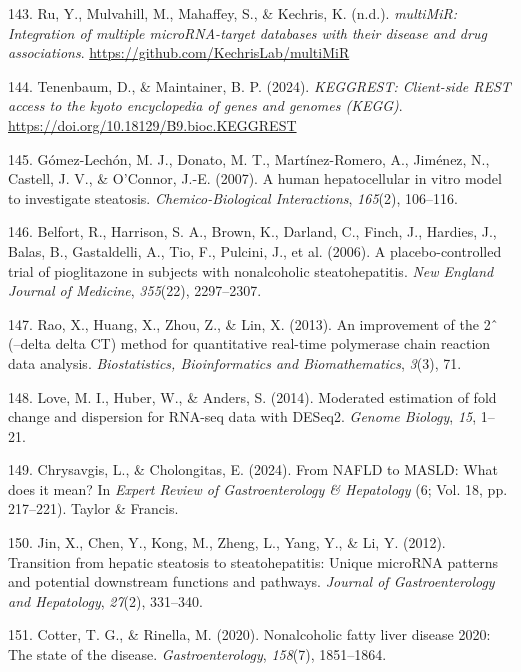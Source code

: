 \documentclass[
  11pt,
  letterpaper,
]{book}
\newlength{\cslhangindent}
\newenvironment{CSLReferences}[2] %
 {\begin{list}{}{%
  \setlength{\itemindent}{0pt}
  \setlength{\leftmargin}{0pt}
  \setlength{\parsep}{0pt}
  \ifodd #1
   \setlength{\leftmargin}{\cslhangindent}
   \setlength{\itemindent}{-1\cslhangindent}
  \fi
  \setlength{\itemsep}{#2\baselineskip}}}
 {\end{list}}
\begin{document}
\begin{CSLReferences}{1}{0}
143. Ru, Y., Mulvahill, M., Mahaffey, S., \& Kechris, K. (n.d.).
\emph{multiMiR: Integration of multiple microRNA-target databases with
their disease and drug associations}.
\url{https://github.com/KechrisLab/multiMiR}

144. Tenenbaum, D., \& Maintainer, B. P. (2024). \emph{KEGGREST:
Client-side REST access to the kyoto encyclopedia of genes and genomes
(KEGG)}. \url{https://doi.org/10.18129/B9.bioc.KEGGREST}

145. Gómez-Lechón, M. J., Donato, M. T., Martínez-Romero, A., Jiménez,
N., Castell, J. V., \& O'Connor, J.-E. (2007). A human hepatocellular in
vitro model to investigate steatosis. \emph{Chemico-Biological
Interactions}, \emph{165}(2), 106--116.

146. Belfort, R., Harrison, S. A., Brown, K., Darland, C., Finch, J.,
Hardies, J., Balas, B., Gastaldelli, A., Tio, F., Pulcini, J., et al.
(2006). A placebo-controlled trial of pioglitazone in subjects with
nonalcoholic steatohepatitis. \emph{New England Journal of Medicine},
\emph{355}(22), 2297--2307.

147. Rao, X., Huang, X., Zhou, Z., \& Lin, X. (2013). An improvement of
the 2ˆ (--delta delta CT) method for quantitative real-time polymerase
chain reaction data analysis. \emph{Biostatistics, Bioinformatics and
Biomathematics}, \emph{3}(3), 71.

148. Love, M. I., Huber, W., \& Anders, S. (2014). Moderated estimation
of fold change and dispersion for RNA-seq data with DESeq2. \emph{Genome
Biology}, \emph{15}, 1--21.

149. Chrysavgis, L., \& Cholongitas, E. (2024). From NAFLD to MASLD:
What does it mean? In \emph{Expert Review of Gastroenterology \&
Hepatology} (6; Vol. 18, pp. 217--221). Taylor \& Francis.

150. Jin, X., Chen, Y., Kong, M., Zheng, L., Yang, Y., \& Li, Y. (2012).
Transition from hepatic steatosis to steatohepatitis: Unique microRNA
patterns and potential downstream functions and pathways. \emph{Journal
of Gastroenterology and Hepatology}, \emph{27}(2), 331--340.

151. Cotter, T. G., \& Rinella, M. (2020). Nonalcoholic fatty liver
disease 2020: The state of the disease. \emph{Gastroenterology},
\emph{158}(7), 1851--1864.


\end{CSLReferences}
\end{document}
